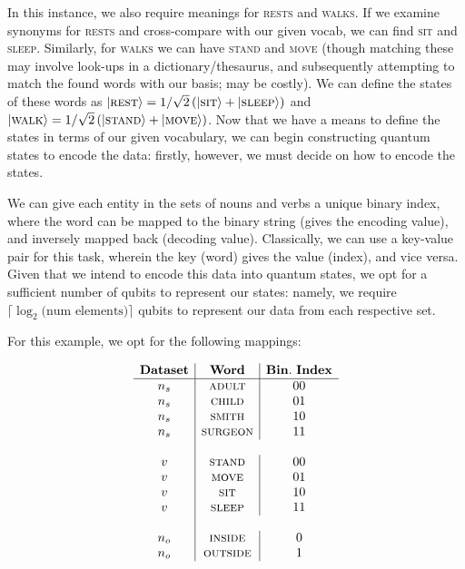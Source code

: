 In this instance, we also require meanings for \textsc{rests} and \textsc{walks}. If we examine synonyms for \textsc{rests} and cross-compare with our given vocab, we can find \textsc{sit} and \textsc{sleep}. Similarly, for \textsc{walks} we can have \textsc{stand} and \textsc{move} (though matching these may involve look-ups in a dictionary/thesaurus, and subsequently attempting to match the found words with our basis; may be costly). We can define the states of these words as $\vert \textsc{rest} \rangle = 1/\sqrt{2}\left(\vert \textsc{sit} \rangle + \vert \textsc{sleep} \rangle\right)$ and $\vert \textsc{walk} \rangle = 1/\sqrt{2}\left(\vert \textsc{stand} \rangle + \vert \textsc{move} \rangle\right)$.
Now that we have a means to define the states in terms of our given vocabulary, we can begin constructing quantum states to encode the data: firstly, however, we must decide on how to encode the states.

We can give each entity in the sets of nouns and verbs a unique binary index, where the word can be mapped to the binary string (gives the encoding value), and inversely mapped back (decoding value). Classically, we can use a key-value pair for this task, wherein the key (word) gives the value (index), and vice versa. Given that we intend to encode this data into quantum states, we opt for a sufficient number of qubits to represent our states: namely, we require $\lceil \log_2({\textrm{num elements})} \rceil$ qubits to represent our data from each respective set.

For this example, we opt for the following mappings:

\begin{equation*}
\begin{array}{c|c|c}
\mathbf{Dataset} & \mathbf{Word} & \mathbf{Bin.~Index} \\
\hline
{n_s} & \textsc{adult} & 00 \\
{n_s} & \textsc{child} & 01 \\
{n_s} & \textsc{smith} & 10 \\
{n_s} & \textsc{surgeon} & 11 \\
\\
{v} & \textsc{stand} & 00 \\
{v} & \textsc{move} & 01 \\
{v} & \textsc{sit} & 10 \\
{v} & \textsc{sleep} & 11 \\
\\
{n_o} & \textsc{inside} & 0 \\
{n_o} & \textsc{outside} & 1 \\
\end{array}
\end{equation*}

